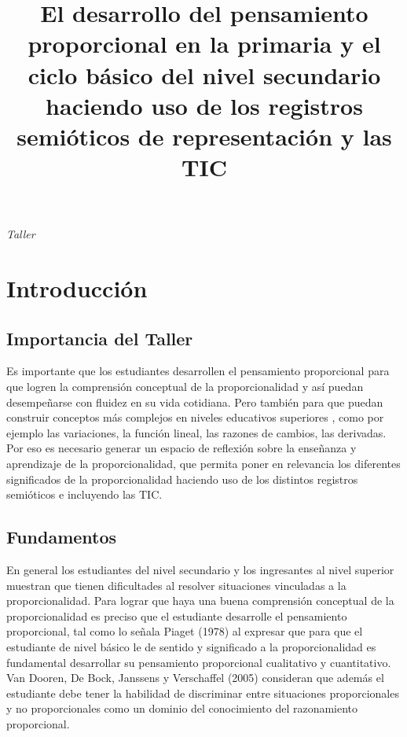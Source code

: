 \documentclass[oneside,spanish]{amsart}
\numberwithin{equation}{section}
\numberwithin{figure}{section}
\begin{document}
\title{El desarrollo del pensamiento proporcional en la primaria y el ciclo básico del nivel secundario haciendo uso de los registros semióticos de representación y las TIC}
\maketitle
\noindent \begin{flushright}
\textsl{\small{}Taller}{\small{} }{\small\par}
\par\end{flushright}

\section{Introducción}

\subsection{Importancia del Taller}

Es importante que los estudiantes desarrollen el pensamiento proporcional para que logren la comprensión conceptual de la proporcionalidad y así  puedan desempeñarse con fluidez en su vida cotidiana. Pero también para que puedan  construir conceptos más complejos en niveles educativos superiores , como por ejemplo  las variaciones, la función lineal, las razones de cambios, las derivadas. Por eso es necesario generar un espacio de reflexión sobre la enseñanza y aprendizaje de la proporcionalidad, que permita poner en relevancia los diferentes significados de la proporcionalidad haciendo uso de los distintos registros semióticos e incluyendo las TIC. 

\subsection{Fundamentos}

En general los estudiantes del nivel secundario y los ingresantes al nivel superior  muestran que tienen dificultades al resolver situaciones vinculadas a la proporcionalidad.  Para lograr que haya una buena comprensión conceptual de la proporcionalidad es preciso que el estudiante desarrolle el pensamiento proporcional, tal como lo señala Piaget (1978) al expresar que para que el estudiante de nivel básico le de sentido y significado a la proporcionalidad es fundamental desarrollar su pensamiento proporcional cualitativo y cuantitativo. Van Dooren, De Bock, Janssens y Verschaffel (2005) consideran que además el estudiante debe tener la habilidad de discriminar entre situaciones proporcionales y no proporcionales como un dominio del conocimiento del razonamiento proporcional.
\end{document}
